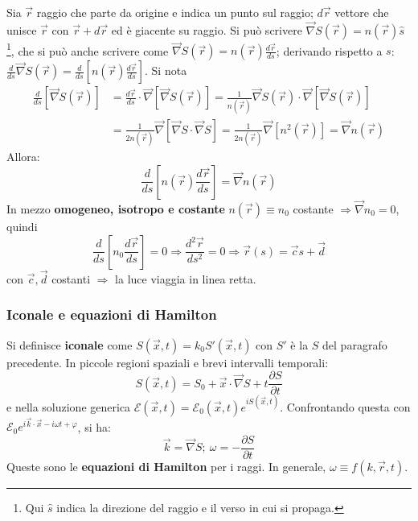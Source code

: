 \documentclass[10pt, a4paper]{scrartcl}
\numberwithin{equation}{subsection}
\theoremstyle{style1}
\begin{document}
Sia $\vec{r}$ raggio che parte da origine e indica un punto sul raggio; $d\vec{r}$ vettore che unisce $\vec{r}$ con $\vec{r}+d\vec{r}$ ed \`e giacente su raggio. Si pu\`o scrivere $\vec{\nabla }S(\vec{r})=n(\vec{r}) \hat{s}$\footnote{Qui $\hat{s}$ indica la direzione del raggio e il verso in cui si propaga.}, che si pu\`o anche scrivere come $\vec{\nabla }S(\vec{r}) = n(\vec{r}) \frac{d \vec{r}}{d s} $; derivando rispetto a $s$: $\frac{d }{d s} \vec{\nabla }S(\vec{r}) = \frac{d }{d s} \left[ n(\vec{r}) \frac{d \vec{r}}{d s} \right] $. Si nota
\[
\begin{split}
	\frac{d }{d s} \left[ \vec{\nabla }S(\vec{r}) \right] &= \frac{d \vec{r}}{d s}\cdot \vec{\nabla }  \left[ \vec{\nabla }S(\vec{r}) \right] = \frac{1}{n(\vec{r})}\vec{\nabla }S(\vec{r}) \cdot \vec{\nabla }\left[ \vec{\nabla }S(\vec{r}) \right] \\
							      &=\frac{1}{2n(\vec{r})} \vec{\nabla }\left[ \vec{\nabla }S \cdot \vec{\nabla }S \right] = \frac{1}{2n(\vec{r})}\vec{\nabla }\left[ n^2 (\vec{r})\right] = \vec{\nabla}n(\vec{r})
\end{split}
\] 
Allora:
\begin{equation}
	\frac{d }{d s} \left[ n(\vec{r}) \frac{d \vec{r}}{d s}  \right] = \vec{\nabla }n(\vec{r})
\end{equation}
In mezzo \textbf{omogeneo, isotropo e costante} $n(\vec{r}) \equiv n_0$  costante $\Rightarrow \vec{\nabla }n_0 = 0$, quindi 
\begin{equation}
	\frac{d }{d s} \left[ n_0 \frac{d \vec{r}}{d s}  \right] = 0 \Rightarrow \frac{d ^2\vec{r}}{d s^2} = 0 \Rightarrow \vec{r}(s) = \vec{c}s + \vec{d} 
\end{equation}
con $\vec{c},\vec{d}$ costanti $\Rightarrow $ la luce viaggia in linea retta.

\subsubsection{Iconale e equazioni di Hamilton}

Si definisce \textbf{iconale} come $S(\vec{x},t) = k_0 S'(\vec{x},t)$ con $S'$ \`e la $S$ del paragrafo precedente. In piccole regioni spaziali e brevi intervalli temporali:
\begin{equation}
	S(\vec{x},t) = S_0 + \vec{x}\cdot \vec{\nabla }S + t \frac{\partial S}{\partial t} 
\end{equation}
e nella soluzione generica $\mathcal{E}(\vec{x},t) = \mathcal{E}_0 (\vec{x},t) e^{i S(\vec{x},t)} $. Confrontando questa con $\mathcal{E}_0 e^{i \vec{k}\cdot \vec{x}-i \omega t + \varphi } $, si ha:
\begin{equation}
	\vec{k}= \vec{\nabla }S ;\ \omega =- \frac{\partial S}{\partial t} 
\end{equation}
Queste sono le \textbf{equazioni di Hamilton} per i raggi. In generale, $\omega \equiv f(k,\vec{r},t)$.
\end{document}

